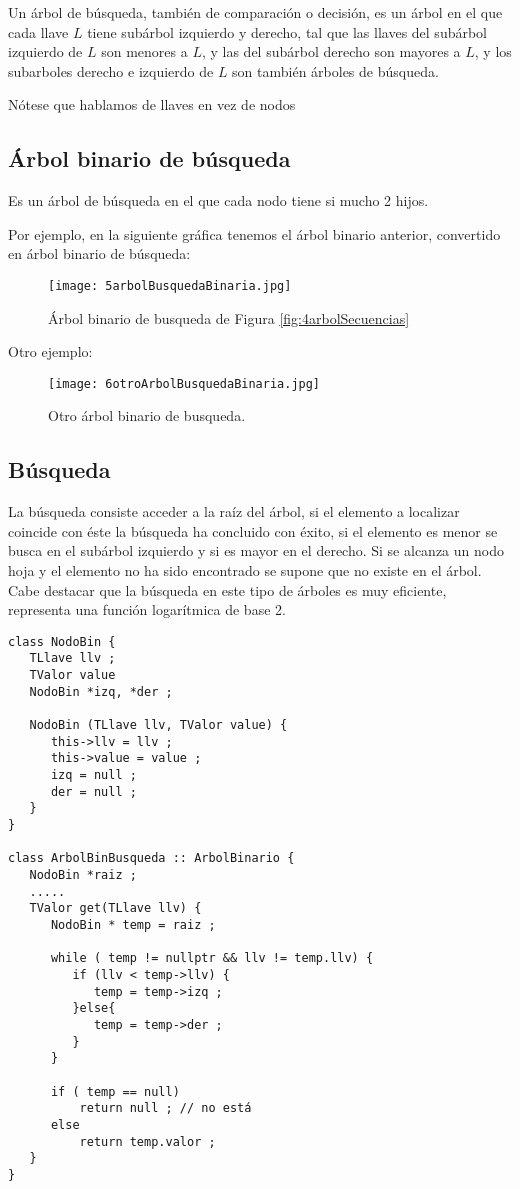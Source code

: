 Un árbol de búsqueda, también de comparación o decisión, es un árbol
en el que cada llave $L$ tiene subárbol izquierdo y derecho, tal que las
llaves del subárbol izquierdo de $L$ son menores a $L$, y las del subárbol
derecho son mayores a $L$, y los subarboles derecho e izquierdo de $L$ son
también árboles de búsqueda.

Nótese que hablamos de llaves en vez de nodos

\subsection{Árbol binario de búsqueda}
\label{sec:arbol-binario-de}
Es un árbol de búsqueda en el que cada nodo tiene si mucho 2 hijos.

Por ejemplo, en la siguiente gráfica tenemos el árbol binario
anterior, convertido en árbol binario de búsqueda:

\begin{figure}[H]
  \centering
  \texttt{[image: 5arbolBusquedaBinaria.jpg]}
  \caption{Árbol binario de busqueda de Figura \ref{fig:4arbolSecuencias}}
  \label{fig:5arbolBusquedaBinaria}
\end{figure}

 Otro ejemplo:
\begin{figure}[H]
  \centering
  \texttt{[image: 6otroArbolBusquedaBinaria.jpg]}
  \caption{Otro árbol binario de busqueda.}
  \label{fig:6otroArbolBusquedaBinaria}
\end{figure}

\subsection{Búsqueda}
\label{sec:busqueda}

La búsqueda consiste acceder a la raíz del árbol, si el elemento a
localizar coincide con éste la búsqueda ha concluido con éxito, si el
elemento es menor se busca en el subárbol izquierdo y si es mayor en
el derecho. Si se alcanza un nodo hoja y el elemento no ha sido
encontrado se supone que no existe en el árbol. Cabe destacar que la
búsqueda en este tipo de árboles es muy eficiente, representa una
función logarítmica de base 2.
\begin{verbatim}
class NodoBin {
   TLlave llv ;
   TValor value
   NodoBin *izq, *der ;

   NodoBin (TLlave llv, TValor value) {
      this->llv = llv ;
      this->value = value ;
      izq = null ;
      der = null ;
   }
}

class ArbolBinBusqueda :: ArbolBinario {
   NodoBin *raiz ;
   .....
   TValor get(TLlave llv) {
      NodoBin * temp = raiz ;

      while ( temp != nullptr && llv != temp.llv) {
         if (llv < temp->llv) {
            temp = temp->izq ;
         }else{
            temp = temp->der ;
         }
      }

      if ( temp == null)
          return null ; // no está
      else
          return temp.valor ;
   }
} 
\end{verbatim}

